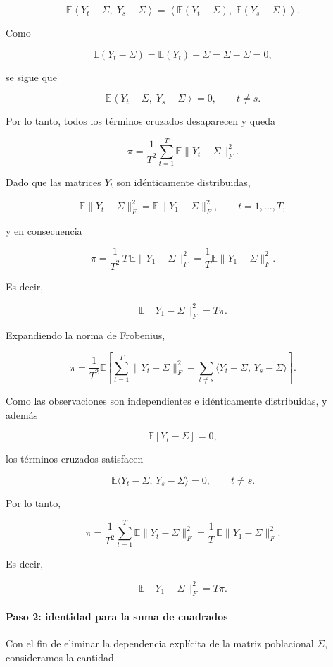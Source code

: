 \documentclass[letterpaper,12pt,oneside]{book}
\begin{document}
\[
\mathbb{E}\left\langle Y_t-\Sigma,\; Y_s-\Sigma\right\rangle
=
\left\langle
\mathbb{E}(Y_t-\Sigma),\;
\mathbb{E}(Y_s-\Sigma)
\right\rangle.
\]

Como

\[
\mathbb{E}(Y_t-\Sigma)
=
\mathbb{E}(Y_t)-\Sigma
=
\Sigma-\Sigma
=
0,
\]

se sigue que

\[
\mathbb{E}\left\langle Y_t-\Sigma,\; Y_s-\Sigma\right\rangle = 0,
\qquad t\neq s.
\]

Por lo tanto, todos los términos cruzados desaparecen y queda

\[
\pi
=
\frac{1}{T^2}
\sum_{t=1}^{T}
\mathbb{E}\|Y_t-\Sigma\|_F^2.
\]

Dado que las matrices $Y_t$ son idénticamente distribuidas,

\[
\mathbb{E}\|Y_t-\Sigma\|_F^2
=
\mathbb{E}\|Y_1-\Sigma\|_F^2,
\qquad t=1,\dots,T,
\]

y en consecuencia

\[
\pi
=
\frac{1}{T^2}\,T\,\mathbb{E}\|Y_1-\Sigma\|_F^2
=
\frac{1}{T}\mathbb{E}\|Y_1-\Sigma\|_F^2.
\]

Es decir,

\[
\mathbb{E}\|Y_1-\Sigma\|_F^2 = T\pi.
\]

Expandiendo la norma de Frobenius,

\[
\pi
=
\frac{1}{T^2}
\mathbb{E}
\left[
\sum_{t=1}^{T}\|Y_t-\Sigma\|_F^2
+
\sum_{t\neq s}\langle Y_t-\Sigma,\,Y_s-\Sigma\rangle
\right].
\]

Como las observaciones son independientes e idénticamente distribuidas, y además

\[
\mathbb{E}[Y_t-\Sigma]=0,
\]

los términos cruzados satisfacen

\[
\mathbb{E}\langle Y_t-\Sigma,\,Y_s-\Sigma\rangle = 0,
\qquad t\neq s.
\]

Por lo tanto,

\[
\pi
=
\frac{1}{T^2}
\sum_{t=1}^{T}
\mathbb{E}\|Y_t-\Sigma\|_F^2
=
\frac{1}{T}\,\mathbb{E}\|Y_1-\Sigma\|_F^2.
\]

Es decir,

\[
\mathbb{E}\|Y_1-\Sigma\|_F^2 = T\pi.
\]

\paragraph{Paso 2: identidad para la suma de cuadrados}

Con el fin de eliminar la dependencia explícita de la matriz poblacional $\Sigma$, consideramos la cantidad
\end{document}
